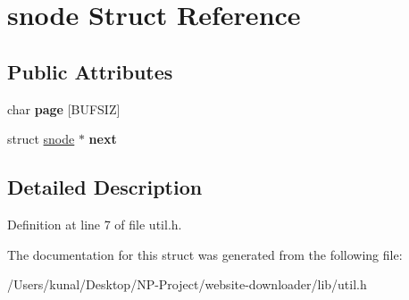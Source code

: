\hypertarget{structsnode}{}\section{snode Struct Reference}
\label{structsnode}
\subsection*{Public Attributes}
\begin{DoxyCompactItemize}
\item 
\mbox{\label{structsnode_aeaaa411d08f4e183e6c6c292cd72e85d}} 
char {\bfseries page} \mbox{[}B\+U\+F\+S\+IZ\mbox{]}
\item 
\mbox{\label{structsnode_a91a76319ab431b979edd96540899a605}} 
struct \hyperlink{structsnode}{snode} $\ast$ {\bfseries next}
\end{DoxyCompactItemize}


\subsection{Detailed Description}


Definition at line 7 of file util.\+h.



The documentation for this struct was generated from the following file\+:\begin{DoxyCompactItemize}
\item 
/\+Users/kunal/\+Desktop/\+N\+P-\/\+Project/website-\/downloader/lib/util.\+h\end{DoxyCompactItemize}
